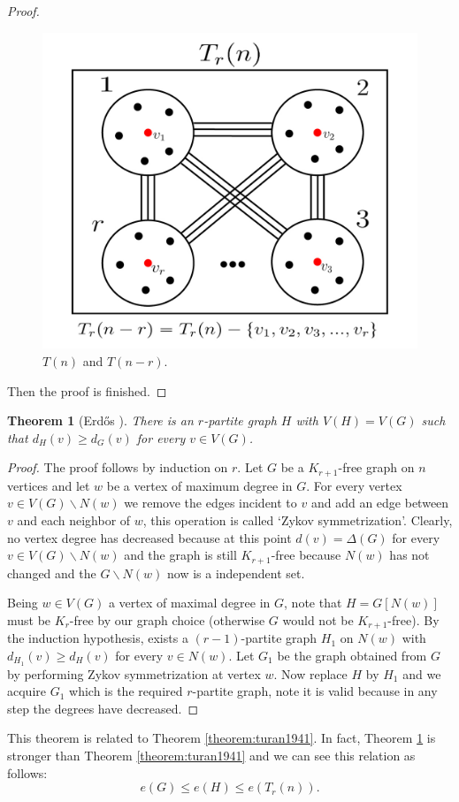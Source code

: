 \documentclass[12pt,twoside,a4paper]{book}
\numberwithin{equation}{section}
\let\setminus=\smallsetminus
\newtheorem{theorem}             {Theorem}[section]
\theoremstyle{remark}
\begin{document}
\begin{proof}
 \begin{figure}[H]
     \centering
     \includegraphics[scale=1]{Figuras/t(n)-and-t(n-r)}
     \caption{$T(n)$ and $T(n-r)$.}
     \label{fig:t(n)-and-t(n-r)}
\end{figure}
Then the proof is finished.
\end{proof}

\begin{theorem}[{Erd\H{o}s \cite{Er70}}]\label{theorem:erdos1970} There is an $ r$-partite graph $H$ with $V(H) = V(G)$ such that $d_H(v) \geq d_G(v)$ for every $v \in V(G)$.\\
\end{theorem}

\begin{proof}
The proof follows by induction on $r$. Let $G$ be a $ K_{r+1}$-free graph on $n$ vertices and let $w$ be a vertex of maximum degree in $G$. For every vertex $v \in V(G)\setminus N(w)$ we remove the edges incident to $v$ and add an edge between $v$ and each neighbor of $w$, this operation is called `Zykov symmetrization'. Clearly, no vertex degree has decreased because at this point $d(v) = \Delta(G)$ for every $v \in V(G)\setminus N(w)$ and the graph is still $K_{r+1}$-free because $N(w)$ has not changed and the $G\setminus N(w)$ now is a independent set.

Being $w\in V(G)$ a vertex of maximal degree in $G$, note that $H=G[N(w)]$ must be $K_r$-free by our graph choice (otherwise $G$ would not be $K_{r+1}$-free). By the induction hypothesis, exists a $(r-1)$-partite graph $H_1$ on $N(w)$ with $d_{H_1}(v) \geq d_{H}(v)$ for every $v \in N(w)$. Let $G_1$ be the graph obtained from $G$ by performing Zykov symmetrization at vertex $w$. Now replace $H$ by $H_1$ and we acquire $G_1$ which is the required $r$-partite graph, note it is valid because in any step the degrees have decreased.
\end{proof}
This theorem is related to Theorem \ref{theorem:turan1941}. In fact, Theorem \ref{theorem:erdos1970} is stronger than Theorem \ref{theorem:turan1941} and we can see this relation as follows: $$e(G) \leq e(H) \leq e(T_r(n)).$$
\end{document}
